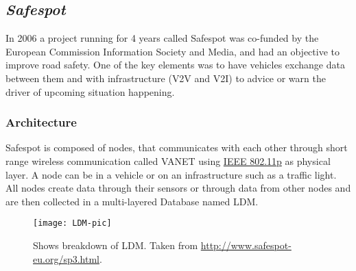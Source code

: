\subsection{\textit{Safespot}}
In 2006 a project running for 4 years called Safespot \cite{Safespot} was co-funded by the European Commission Information Society and Media, and had an objective to improve road safety. One of the key elements was to have vehicles exchange data between them and with infrastructure (\acrshort{V2V} and \acrshort{V2I}) to advice or warn the driver of upcoming situation happening.\par
% 
\subsubsection{Architecture}
Safespot is composed of nodes, that communicates with each other through short range wireless communication called \acrfull{VANET} using \hyperref[sec:802.11p]{IEEE 802.11p} as physical layer. A node can be in a vehicle or on an infrastructure such as a traffic light. All nodes create data through their sensors or through data from other nodes and are then collected in a multi-layered Database named \acrfull{LDM}.

\begin{figure}[h]
    \centering
    \texttt{[image: LDM-pic]}
    \caption{Shows breakdown of \acrshort{LDM}. Taken from \url{http://www.safespot-eu.org/sp3.html}.}
    \label{fig:LDM}
\end{figure}

